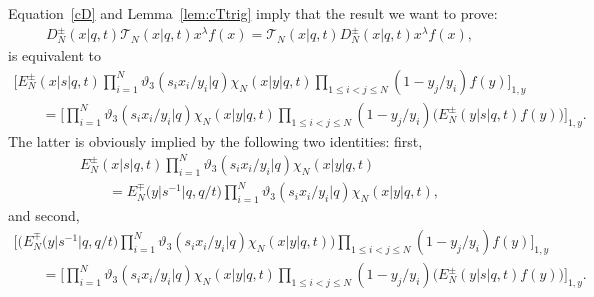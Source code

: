 \documentclass[pdftex]{sigma}%
\numberwithin{equation}{section}
\newcommand{\cT}{{\mathcal T}}
\begin{document}
Equation~\eqref{cD} and Lemma~\ref{lem:cTtrig} imply that the result we want to prove:
\begin{gather*}
D_N^\pm(x|q,t)\cT_N(x|q,t)x^\lambda f(x)=\cT_N(x|q,t) D_N^\pm(x|q,t)x^\lambda f(x),
\end{gather*}
is equivalent to
\begin{gather*}
\Bigg[ E^\pm_N(x|s|q,t) \prod_{i=1}^N\vartheta_3(s_ix_i/y_i|q)\chi_N(x|y|q,t) \prod_{1\leq i<j\leq N}(1-y_j/y_i)f(y)\Bigg]_{1,y}
\\ \qquad
{}= \Bigg[\prod_{i=1}^N\vartheta_3(s_ix_i/y_i|q)\chi_N(x|y|q,t) \prod_{1\leq i<j\leq N}(1-y_j/y_i)\big( E^\pm_N(y|s|q,t) f(y)\big) \Bigg]_{1,y}\! .
\end{gather*}
The latter is obviously implied by the following two identities: first,
\begin{gather}
E^\pm_N(x|s|q,t) \prod_{i=1}^N\vartheta_3(s_ix_i/y_i|q)\chi_N(x|y|q,t) \nonumber
\\ \qquad
{}=E^\mp_N\big(y\big|s^{-1}\big|q,q/t\big) \prod_{i=1}^N\vartheta_3(s_ix_i/y_i|q)\chi_N(x|y|q,t) ,
\label{toprove1}
\end{gather}
and second,
\begin{gather}
\Bigg[ \Bigg( E^\mp_N\big(y\big|s^{-1}\big|q,q/t\big) \prod_{i=1}^N\vartheta_3(s_ix_i/y_i|q)\chi_N(x|y|q,t)\Bigg) \prod_{1\leq i<j\leq N}(1-y_j/y_i)f(y)\Bigg]_{1,y} \nonumber
\\ \qquad
{}= \Bigg[\prod_{i=1}^N\vartheta_3(s_ix_i/y_i|q)\chi_N(x|y|q,t) \prod_{1\leq i<j\leq N}(1-y_j/y_i)\big( E^\pm_N(y|s|q,t) f(y)\big) \Bigg]_{1,y}\! .
\label{toprove2}
\end{gather}
\end{document}
